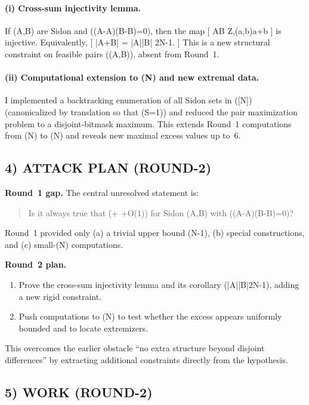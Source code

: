 \paragraph{(i) Cross-sum injectivity lemma.}
If (A,B\subset [N]) are Sidon and ((A-A)\cap(B-B)={0}), then the map
[
A\times B \to \mathbb Z,\qquad (a,b)\mapsto a+b
]
is injective.  Equivalently,
[
|A+B| = |A||B| \le 2N-1.
]
This is a new structural constraint on feasible pairs ((A,B)), absent from Round~1.

\paragraph{(ii) Computational extension to (N) and new extremal data.}
I implemented a backtracking enumeration of all Sidon sets in ([N]) (canonicalized by translation so that (\min S=1)) and reduced the pair maximization problem to a disjoint-bitmask maximum.  This extends Round~1 computations from (N) to (N) and reveals new maximal excess values up to~6.

\subsection{4) ATTACK PLAN (ROUND-2)}
\textbf{Round~1 gap.} The central unresolved statement is:
\begin{quote}
	Is it always true that (+ \le {}+O(1)) for Sidon (A,B\subset [N]) with ((A-A)\cap(B-B)={0})?
\end{quote}
Round~1 provided only (a) a trivial upper bound (N-1), (b) special constructions, and (c) small-(N) computations.

\textbf{Round~2 plan.}
\begin{enumerate}
	\item Prove the cross-sum injectivity lemma and its corollary (|A||B|\le 2N-1), adding a new rigid constraint.
	\item Push computations to (N) to test whether the excess appears uniformly bounded and to locate extremizers.
\end{enumerate}
This overcomes the earlier obstacle “no extra structure beyond disjoint differences” by extracting additional constraints directly from the hypothesis.

\subsection{5) WORK (ROUND-2)}

